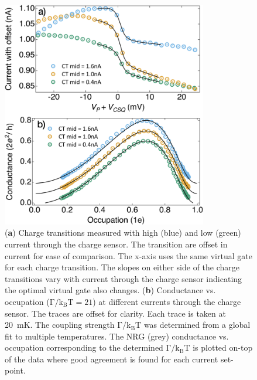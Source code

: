 \begin{figure}[ht]
  \begin{center}
    \includegraphics[width=0.8\textwidth]{figures/ch3/crop_FiguresMaster.017.png}
    \caption[Conductance vs. Occupation : Varying the current through the charge sensor]{\label{fig:ch3/cond_occ_QPC_vs_ct} 
    (\textbf{a}) Charge transitions measured with high (blue) and low (green) current through the charge sensor. The transition are offset in current for ease of comparison. The x-axis uses the same virtual gate for each charge transition. The slopes on either side of the charge transitions vary with current through the charge sensor indicating the optimal virtual gate also changes. (\textbf{b}) Conductance vs. occupation ($\mathrm{\Gamma/k_BT=21}$) at different currents through the charge sensor. The traces are offset for clarity. Each trace is taken at \qty{20}{mK}. The coupling strength $\mathrm{\Gamma/k_BT}$ was determined from a global fit to multiple temperatures. The NRG (grey) conductance vs. occupation corresponding to the determined $\mathrm{\Gamma/k_BT}$ is plotted on-top of the data where good agreement is found for each current set-point.}
  \end{center}
\end{figure}



